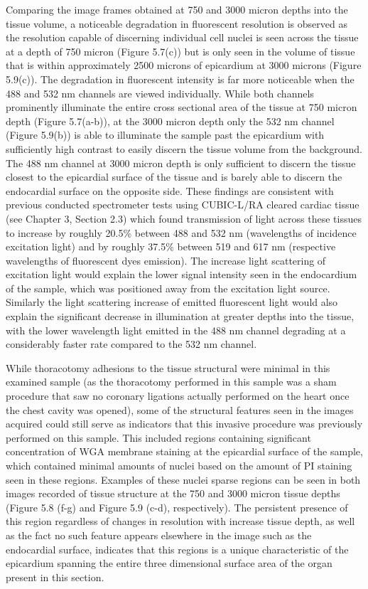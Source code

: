 Comparing the image frames obtained at 750 and 3000 micron depths into the tissue volume, a noticeable degradation in fluorescent resolution is observed as the resolution capable of discerning individual cell nuclei is seen across the tissue at a depth of 750 micron (Figure 5.7(c)) but is only seen in the volume of tissue that is within approximately 2500 microns of epicardium at 3000 microns (Figure 5.9(c)). The degradation in fluorescent intensity is far more noticeable when the 488 and 532 nm channels are viewed individually. While both channels prominently illuminate the entire cross sectional area of the tissue at 750 micron depth (Figure 5.7(a-b)), at the 3000 micron depth only the 532 nm channel (Figure 5.9(b)) is able to illuminate the sample past the epicardium with sufficiently high contrast to easily discern the tissue volume from the background. The 488 nm channel at 3000 micron depth is only sufficient to discern the tissue closest to the epicardial surface of the tissue and is barely able to discern the endocardial surface on the opposite side. These findings are consistent with previous conducted spectrometer tests using CUBIC-L/RA cleared cardiac tissue (see Chapter 3, Section 2.3) which found transmission of light across these tissues to increase by roughly 20.5\% between 488 and 532 nm (wavelengths of incidence excitation light) and by roughly 37.5\% between 519 and 617 nm (respective wavelengths of fluorescent dyes emission). The increase light scattering of excitation light would explain the lower signal intensity seen in the endocardium of the sample, which was positioned away from the excitation light source. Similarly the light scattering increase of emitted fluorescent light would also explain the significant decrease in illumination at greater depths into the tissue, with the lower wavelength light emitted in the 488 nm channel degrading at a considerably faster rate compared to the 532 nm channel.

While thoracotomy adhesions to the tissue structural were minimal in this examined sample (as the thoracotomy performed in this sample was a sham procedure that saw no coronary ligations actually performed on the heart once the chest cavity was opened), some of the structural features seen in the images acquired could still serve as indicators that this invasive procedure was previously performed on this sample. This included regions containing significant concentration of WGA membrane staining at the epicardial surface of the sample, which contained minimal amounts of nuclei based on the amount of PI staining seen in these regions. Examples of these nuclei sparse regions can be seen in both images recorded of tissue structure at the 750 and 3000 micron tissue depths (Figure 5.8 (f-g) and Figure 5.9 (c-d), respectively). The persistent presence of this region regardless of changes in resolution with increase tissue depth, as well as the fact no such feature appears elsewhere in the image such as the endocardial surface, indicates that this regions is a unique characteristic of the epicardium spanning the entire three dimensional surface area of the organ present in this section. 

